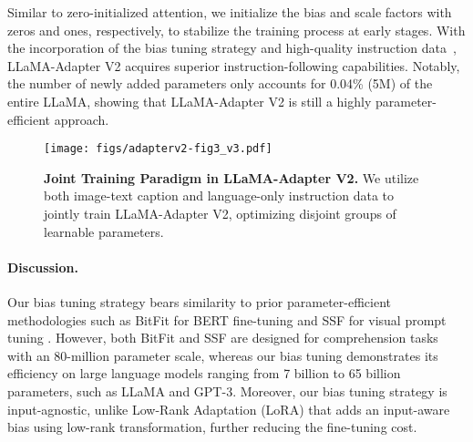 \documentclass[10pt,twocolumn,letterpaper]{article}
\begin{document}
Similar to zero-initialized attention, we initialize the bias and scale factors with zeros and ones, respectively, to stabilize the training process at early stages.
With the incorporation of the bias tuning strategy and high-quality instruction data~\cite{peng2023instruction}, LLaMA-Adapter V2 acquires superior instruction-following capabilities. Notably, the number of newly added parameters only accounts for 0.04\% (5M) of the entire LLaMA, showing that LLaMA-Adapter V2 is still a highly parameter-efficient approach. 


\begin{figure*}[t!]
    \centering
\texttt{[image: figs/adapterv2-fig3\_v3.pdf]}
    \caption{\textbf{Joint Training Paradigm in LLaMA-Adapter V2.} We utilize both image-text caption and language-only instruction data to jointly train LLaMA-Adapter V2, optimizing disjoint groups of learnable parameters.}
    \label{fig22}
\end{figure*}



\paragraph{Discussion.} Our bias tuning strategy bears similarity to prior parameter-efficient methodologies such as BitFit \cite{zaken2021bitfit} for BERT fine-tuning and SSF \cite{lian2022scaling} for visual prompt tuning \cite{jia2022visual}. 
However, both BitFit and SSF are designed for comprehension tasks with an 80-million parameter scale, whereas our bias tuning demonstrates its efficiency on large language models ranging from 7 billion to 65 billion parameters, such as LLaMA and GPT-3.
Moreover, our bias tuning strategy is input-agnostic, unlike Low-Rank Adaptation (LoRA) that adds an input-aware bias using low-rank transformation, further reducing the fine-tuning cost.
\end{document}
